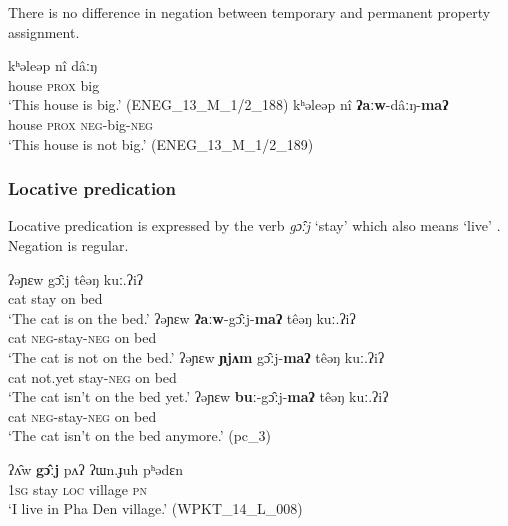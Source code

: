 \documentclass[output=paper,colorlinks,citecolor=brown]{langscibook}
\begin{document}
There is no difference in negation between temporary  and permanent  property assignment.

\ea\label{ex:rum:40}
    \ea\label{ex:rum:40a}
        \gll kʰəleəp	nî	dâːŋ \\ 
             house \textsc{prox} big \\
        \glt  ‘This house is big.’ (ENEG\_13\_M\_1/2\_188)
    \ex\label{ex:rum:40b}
        \gll kʰəleəp	nî	\textbf{ʔaːw}-dâːŋ-\textbf{maʔ} \\
              house \textsc{prox} \textsc{neg}{}-big-\textsc{neg} \\
        \glt ‘This house is not big.’ (ENEG\_13\_M\_1/2\_189)
    \z
\z 

\subsubsection{Locative predication} \label{sec:rum:2.3.4}

Locative predication is expressed by the verb \textit{gɔ̂ːj} ‘stay’  which also means ‘live’ . Negation is regular.

\ea\label{ex:rum:41}
    \ea\label{ex:rum:41a}
        \gll ʔəɲɛw	gɔ̂ːj	têəŋ	kuː.ʔiʔ \\ 
             cat stay on bed \\
        \glt  ‘The cat is on the bed.’
    \ex\label{ex:rum:41b}
        \gll ʔəɲɛw	\textbf{ʔaːw}-gɔ̂ːj-\textbf{maʔ}	têəŋ	kuː.ʔiʔ \\
             cat \textsc{neg}{}-stay-\textsc{neg} on bed \\
        \glt ‘The cat is not on the bed.’
    \ex\label{ex:rum:41c}
        \gll ʔəɲɛw	\textbf{ɲjʌm}	gɔ̂ːj-\textbf{maʔ}	têəŋ	kuː.ʔiʔ \\
             cat not.yet stay-\textsc{neg} on bed \\
        \glt ‘The cat isn’t on the bed yet.’
    \ex\label{ex:rum:41d}
        \gll ʔəɲɛw	\textbf{buː}-gɔ̂ːj-\textbf{maʔ}	têəŋ	kuː.ʔiʔ \\
             cat \textsc{neg}{}-stay-\textsc{neg} on bed \\
        \glt ‘The cat isn’t on the bed anymore.’ (pc\_3)
    \z
\z 

\ea\label{ex:rum:42}
    \gll ʔʌ̂w	\textbf{gɔ̂ːj}	pʌʔ	ʔɯn.ɟuh	pʰədɛn \\
         1\textsc{sg} stay \textsc{loc} village \textsc{pn} \\
    \glt ‘I live in Pha Den village.’ (WPKT\_14\_L\_008)
\z 
\end{document}
